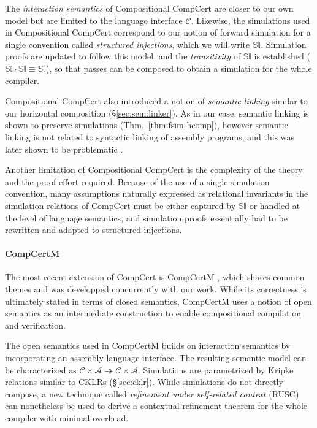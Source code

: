 \documentclass[sigplan,10pt,review]{acmart}
\begin{document}
The \emph{interaction semantics} of
Compositional CompCert \cite{compcompcert}
are closer to our own model
but are limited to the language interface $\mathcal{C}$.
Likewise, the simulations used in Compositional CompCert
correspond to our notion of forward simulation
for a single convention called \emph{structured injections},
which we will write $\mathbb{SI}$.
Simulation proofs are updated to follow this model,
and the \emph{transitivity} of $\mathbb{SI}$ is established
($\mathbb{SI} \cdot \mathbb{SI} \equiv \mathbb{SI}$),
so that passes can be composed
to obtain a simulation for the whole compiler.

Compositional CompCert also introduced a notion of \emph{semantic linking}
similar to our horizontal composition
(\S\ref{sec:sem:linker}).
As in our case,
semantic linking is shown to preserve simulations
(Thm.~\ref{thm:fsim-hcomp}),
however semantic linking is not related to
syntactic linking of assembly programs,
and this was later shown to be problematic \cite{compcertm}.

Another limitation of Compositional CompCert
is the complexity of the theory
and the proof effort required.
Because of the use of a single simulation convention,
many assumptions naturally expressed as
relational invariants in the simulation relations of CompCert
must be either captured by $\mathbb{SI}$
or handled at the level of language semantics,
and simulation proofs
essentially had to be rewritten and adapted to
structured injections.


\paragraph{CompCertM} %

The most recent extension of CompCert is CompCertM \cite{compcertm},
which shares common themes and was developped concurrently
with our work.
While its correctness
is ultimately stated in terms of closed semantics,
CompCertM uses a notion of open semantics
as an intermediate construction
to enable compositional compilation and verification.

The open semantics used in CompCertM
builds on interaction semantics
by incorporating an assembly language interface.
The resulting semantic model can be characterized as
$\mathcal{C} \times \mathcal{A} \twoheadrightarrow
 \mathcal{C} \times \mathcal{A}$.
Simulations
are parametrized by Kripke relations similar to CKLRs (\S\ref{sec:cklr}).
While simulations do not directly compose,
a new technique called \emph{refinement under self-related context}
(RUSC)
can nonetheless be used to derive a contextual refinement theorem
for the whole compiler with minimal overhead.
\end{document}

